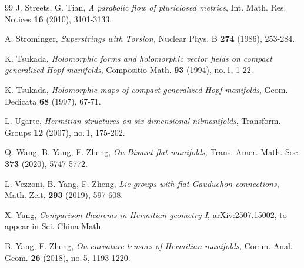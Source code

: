 \documentclass{amsart}
\numberwithin{equation}{section}
\theoremstyle{definition}
\renewcommand{\1}{\mathds{1}}
\renewcommand{\>}{\rightarrow}
\begin{document}
\begin{thebibliography}{99}
 J. Streets, G. Tian,
\newblock \textit{A parabolic flow of pluriclosed metrics},
\newblock Int. Math. Res. Notices {\bf 16} (2010), 3101-3133.



 A. Strominger,
\newblock \emph{Superstrings with Torsion,}
\newblock Nuclear Phys. B {\bf 274} (1986), 253-284.

 K. Tsukada,
\newblock \textit{Holomorphic forms and holomorphic vector fields on compact generalized Hopf manifolds},
\newblock Compositio Math. {\bf 93} (1994), no.\,1, 1-22.

 K. Tsukada,
\newblock \textit{Holomorphic maps of compact generalized Hopf manifolds},
\newblock Geom. Dedicata {\bf 68} (1997), 67-71.


 L. Ugarte,
\newblock \textit{Hermitian structures on six-dimensional nilmanifolds},
\newblock Transform. Groups \textbf{12} (2007), no.\,1, 175-202.


 Q. Wang, B. Yang, F. Zheng,
\newblock \textit{On Bismut flat manifolds,}
\newblock Trans. Amer. Math. Soc. \textbf{373} (2020), 5747-5772.


 L. Vezzoni, B. Yang, F. Zheng,
\newblock \textit{Lie groups with flat Gauduchon connections},
\newblock Math. Zeit. \textbf{293} (2019), 597-608.

 X. Yang,
\newblock \textit{Comparison theorems in Hermitian geometry I},
\newblock arXiv:2507.15002, to appear in Sci. China Math.

 B. Yang, F. Zheng,
\newblock \textit{On curvature tensors of Hermitian manifolds,}
\newblock Comm. Anal. Geom. {\bf 26} (2018), no.\,5, 1193-1220.


\end{thebibliography}
\end{document}
